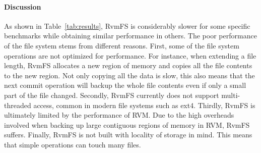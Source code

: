\begin{table}[h]
\centering
\caption{Description of Macro Benchmark Tests. The file size of the randomread benchmark was reduced to simplify evaluation.}
\label{tab:description}
\end{table}

\begin{table}[h]
\centering
\caption{Macro Benchmark Results}
\label{tab:results}
\end{table}

\paragraph{Discussion}

As shown in Table~\ref{tab:results}, RvmFS is considerably slower for some specific benchmarks while obtaining similar performance in others.
The poor performance of the file system stems from different reasons.
First, some of the file system operations are not optimized for performance. For instance, when extending a file length, RvmFS allocates a new region of memory and copies all the file contents
to the new region. Not only copying all the data is slow, this also means that the next commit operation will backup the whole file contents even if only a small part of the file changed.
Secondly, RvmFS currently does not support multi-threaded access, common in modern file systems such as ext4.
Thirdly, RvmFS is ultimately limited by the performance of RVM. Due to the high overheads involved when backing up large contiguous regions of memory in RVM, RvmFS suffers.
Finally, RvmFS is not built with locality of storage in mind. This means that simple operations can touch many files.

